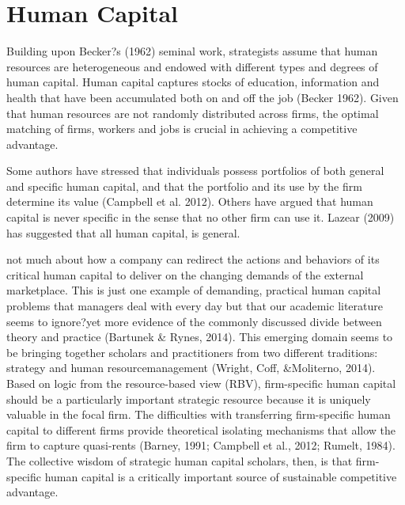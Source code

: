 \documentclass[12pt,letterpaper]{article}
\begin{document}
\section{Human Capital}
Building upon
Becker?s (1962) seminal work, strategists assume
that human resources are heterogeneous and
endowed with different types and degrees of
human capital. Human capital captures stocks
of education, information and health that have
been accumulated both on and off the job
(Becker 1962). Given that human resources are
not randomly distributed across firms, the optimal
matching of firms, workers and jobs is crucial in
achieving a competitive advantage.

Some authors have stressed that individuals possess
portfolios of both general and specific human
capital, and that the portfolio and its use by the
firm determine its value (Campbell et al. 2012). Others have argued that human capital is never
specific in the sense that no other firm can use
it. Lazear (2009) has suggested that all human
capital, is general.



not much about how
a company can redirect the actions and behaviors of
its critical human capital to deliver on the changing
demands of the external marketplace. This is just
one example of demanding, practical human capital
problems that managers deal with every day but
that our academic literature seems to ignore?yet
more evidence of the commonly discussed divide
between theory and practice (Bartunek & Rynes,
2014). This emerging domain seems to be
bringing together scholars and practitioners from
two different traditions: strategy and human resourcemanagement
(Wright, Coff, &Moliterno, 2014). Based on logic from the resource-based view
(RBV), firm-specific human capital should be a particularly
important strategic resource because it is
uniquely valuable in the focal firm. The difficulties
with transferring firm-specific human capital to
different firms provide theoretical isolating mechanisms
that allow the firm to capture quasi-rents
(Barney, 1991; Campbell et al., 2012; Rumelt, 1984).
The collective wisdom of strategic human capital
scholars, then, is that firm-specific human capital
is a critically important source of sustainable competitive
advantage.
\end{document}
